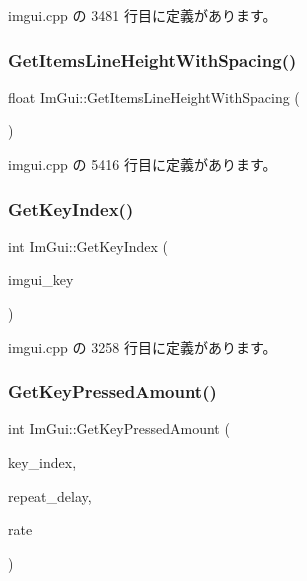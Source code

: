 imgui.\+cpp の 3481 行目に定義があります。

\mbox{\label{namespace_im_gui_a85a5202a65c0663858dba55a206761c5}} 
\subsubsection{\texorpdfstring{Get\+Items\+Line\+Height\+With\+Spacing()}{GetItemsLineHeightWithSpacing()}}
{\footnotesize\ttfamily float Im\+Gui\+::\+Get\+Items\+Line\+Height\+With\+Spacing (\begin{DoxyParamCaption}{ }\end{DoxyParamCaption})}



 imgui.\+cpp の 5416 行目に定義があります。

\mbox{\label{namespace_im_gui_a6cf235f0d0787d51a93f6d90e0bdff9b}} 
\subsubsection{\texorpdfstring{Get\+Key\+Index()}{GetKeyIndex()}}
{\footnotesize\ttfamily int Im\+Gui\+::\+Get\+Key\+Index (\begin{DoxyParamCaption}\item[{\mbox{\hyperlink{imgui_8h_a1671ca739cf1384a8cc268758f27b4e7}{Im\+Gui\+Key}}}]{imgui\+\_\+key }\end{DoxyParamCaption})}



 imgui.\+cpp の 3258 行目に定義があります。

\mbox{\label{namespace_im_gui_ad94a09fc01052f02fe11bec5a3c11275}} 
\subsubsection{\texorpdfstring{Get\+Key\+Pressed\+Amount()}{GetKeyPressedAmount()}}
{\footnotesize\ttfamily int Im\+Gui\+::\+Get\+Key\+Pressed\+Amount (\begin{DoxyParamCaption}\item[{int}]{key\+\_\+index,  }\item[{float}]{repeat\+\_\+delay,  }\item[{float}]{rate }\end{DoxyParamCaption})}



